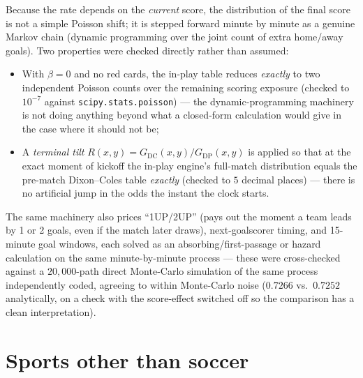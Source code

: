 \documentclass[11pt]{article}
\begin{document}
Because the rate depends on the \emph{current} score, the distribution of the final score is not a
simple Poisson shift; it is stepped forward minute by minute as a genuine Markov chain (dynamic
programming over the joint count of extra home/away goals). Two properties were checked directly
rather than assumed:
\begin{itemize}
\item With $\beta=0$ and no red cards, the in-play table reduces \emph{exactly} to two independent
Poisson counts over the remaining scoring exposure (checked to $10^{-7}$ against
\texttt{scipy.stats.poisson}) --- the dynamic-programming machinery is not doing anything beyond
what a closed-form calculation would give in the case where it should not be;
\item A \emph{terminal tilt} $R(x,y)=G_{\text{DC}}(x,y)/G_{\text{DP}}(x,y)$ is applied so that at
the exact moment of kickoff the in-play engine's full-match distribution equals the pre-match
Dixon--Coles table \emph{exactly} (checked to $5$ decimal places) --- there is no artificial jump
in the odds the instant the clock starts.
\end{itemize}
The same machinery also prices ``1UP/2UP'' (pays out the moment a team leads by 1 or 2 goals, even
if the match later draws), next-goalscorer timing, and 15-minute goal windows, each solved as an
absorbing/first-passage or hazard calculation on the same minute-by-minute process --- these were
cross-checked against a $20{,}000$-path direct Monte-Carlo simulation of the same process
independently coded, agreeing to within Monte-Carlo noise ($0.7266$ vs.\ $0.7252$ analytically, on
a check with the score-effect switched off so the comparison has a clean interpretation).

\section{Sports other than soccer}
\label{sec:othersports}
\end{document}
